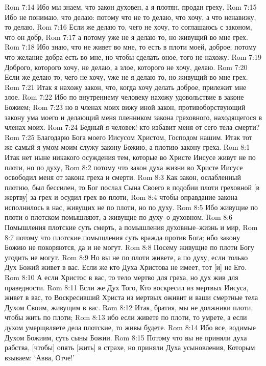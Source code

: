 Rom 7:14  Ибо мы знаем, что закон духовен, а я плотян, продан греху.
Rom 7:15  Ибо не понимаю, что делаю: потому что не то делаю, что хочу, а что ненавижу, то делаю.
Rom 7:16  Если же делаю то, чего не хочу, то соглашаюсь с законом, что он добр,
Rom 7:17  а потому уже не я делаю то, но живущий во мне грех.
Rom 7:18  Ибо знаю, что не живет во мне, то есть в плоти моей, доброе; потому что желание добра есть во мне, но чтобы сделать оное, того не нахожу.
Rom 7:19  Доброго, которого хочу, не делаю, а злое, которого не хочу, делаю.
Rom 7:20  Если же делаю то, чего не хочу, уже не я делаю то, но живущий во мне грех.
Rom 7:21  Итак я нахожу закон, что, когда хочу делать доброе, прилежит мне злое.
Rom 7:22  Ибо по внутреннему человеку нахожу удовольствие в законе Божием;
Rom 7:23  но в членах моих вижу иной закон, противоборствующий закону ума моего и делающий меня пленником закона греховного, находящегося в членах моих.
Rom 7:24  Бедный я человек! кто избавит меня от сего тела смерти?
Rom 7:25  Благодарю Бога моего Иисусом Христом, Господом нашим. Итак тот же самый я умом моим служу закону Божию, а плотию закону греха.
Rom 8:1  Итак нет ныне никакого осуждения тем, которые во Христе Иисусе живут не по плоти, но по духу,
Rom 8:2  потому что закон духа жизни во Христе Иисусе освободил меня от закона греха и смерти.
Rom 8:3  Как закон, ослабленный плотию, был бессилен, то Бог послал Сына Своего в подобии плоти греховной [в жертву] за грех и осудил грех во плоти,
Rom 8:4  чтобы оправдание закона исполнилось в нас, живущих не по плоти, но по духу.
Rom 8:5  Ибо живущие по плоти о плотском помышляют, а живущие по духу--о духовном.
Rom 8:6  Помышления плотские суть смерть, а помышления духовные--жизнь и мир,
Rom 8:7  потому что плотские помышления суть вражда против Бога; ибо закону Божию не покоряются, да и не могут.
Rom 8:8  Посему живущие по плоти Богу угодить не могут.
Rom 8:9  Но вы не по плоти живете, а по духу, если только Дух Божий живет в вас. Если же кто Духа Христова не имеет, тот [и] не Его.
Rom 8:10  А если Христос в вас, то тело мертво для греха, но дух жив для праведности.
Rom 8:11  Если же Дух Того, Кто воскресил из мертвых Иисуса, живет в вас, то Воскресивший Христа из мертвых оживит и ваши смертные тела Духом Своим, живущим в вас.
Rom 8:12  Итак, братия, мы не должники плоти, чтобы жить по плоти;
Rom 8:13  ибо если живете по плоти, то умрете, а если духом умерщвляете дела плотские, то живы будете.
Rom 8:14  Ибо все, водимые Духом Божиим, суть сыны Божии.
Rom 8:15  Потому что вы не приняли духа рабства, [чтобы] опять [жить] в страхе, но приняли Духа усыновления, Которым взываем: `Авва, Отче!'
